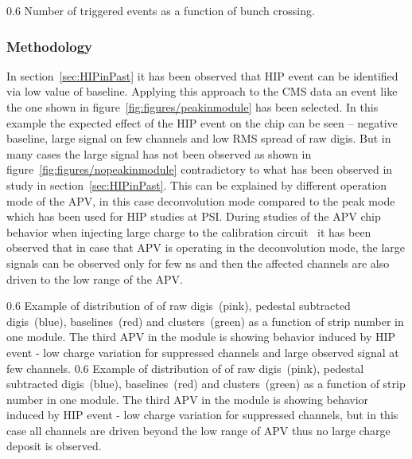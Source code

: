 
                 {0.6}       %
                 {Number of triggered events as a function of bunch crossing.} %


 \subsubsection{Methodology}
 

In section~\ref{sec:HIPinPast} it has been observed that HIP event can be identified via low value of baseline. Applying this approach to the CMS data an event like the one shown in figure~\ref{fig:figures/peakinmodule} has been selected. In this example the expected effect of the HIP event on the chip can be seen -- negative baseline, large signal on few channels and low RMS spread of raw digis. But in many cases the large signal has not been observed as shown in figure~\ref{fig:figures/nopeakinmodule} contradictory to what has been observed in study in section~\ref{sec:HIPinPast}. This can be explained by different operation mode of the APV, in this case deconvolution mode compared to the peak mode which has been used for HIP studies at PSI. During studies of the APV chip behavior when injecting large charge to the calibration circuit~\cite{Bainbridge:2002bda} it has been observed that in case that APV is operating in the deconvolution mode, the large signals can be observed only for few ns and then the affected channels are also driven to the low range of the APV. 

                 {0.6}       %
                 {Example of distribution of of raw digis~(pink), pedestal subtracted digis~(blue), baselines~(red) and clusters~(green) as a function of strip number in one module. The third APV in the module is showing behavior induced by HIP event - low charge variation for suppressed channels and large observed signal at few channels. } %
                 {0.6}       %
                 {Example of distribution of of raw digis~(pink), pedestal subtracted digis~(blue), baselines~(red) and clusters~(green) as a function of strip number in one module. The third APV in the module is showing behavior induced by HIP event - low charge variation for suppressed channels, but in this case all channels are driven beyond the low range of APV thus no large charge deposit is observed. } %

